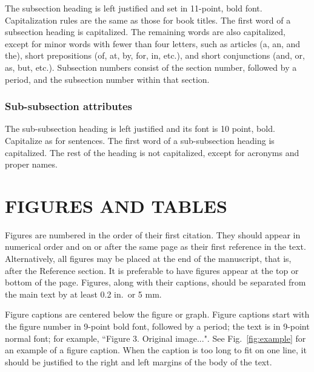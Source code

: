 \documentclass[a4paper]{spie}  %
\begin{document}
The subsection heading is left justified and set in 11-point, bold font.  Capitalization rules are the same as those for book titles.  The first word of a subsection heading is capitalized.  The remaining words are also capitalized, except for minor words with fewer than four letters, such as articles (a, an, and the), short prepositions (of, at, by, for, in, etc.), and short conjunctions (and, or, as, but, etc.).  Subsection numbers consist of the section number, followed by a period, and the subsection number within that section.  

\subsubsection{Sub-subsection attributes} 
The sub-subsection heading is left justified and its font is 10 point, bold.  Capitalize as for sentences.  The first word of a sub-subsection heading is capitalized.  The rest of the heading is not capitalized, except for acronyms and proper names.  

\section{FIGURES AND TABLES} 

Figures are numbered in the order of their first citation.  They should appear in numerical order and on or after the same page as their first reference in the text.  Alternatively, all figures may be placed at the end of the manuscript, that is, after the Reference section.  It is preferable to have figures appear at the top or bottom of the page.  Figures, along with their captions, should be separated from the main text by at least 0.2 in.\ or 5 mm.  

Figure captions are centered below the figure or graph.  Figure captions start with the figure number in 9-point bold font, followed by a period; the text is in 9-point normal font; for example, ``{\footnotesize{Figure 3.}  Original image...}".  See Fig.~\ref{fig:example} for an example of a figure caption.  When the caption is too long to fit on one line, it should be justified to the right and left margins of the body of the text.  
\end{document}
